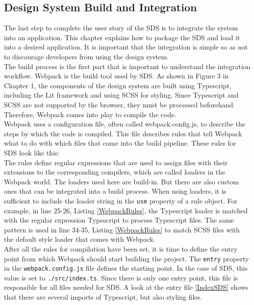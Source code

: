 \subsection{Design System Build and Integration}\label{SDS_build_and_integration}
The last step to complete the user story of the \ac{SDS} is to integrate the system into an application. This chapter explains how to package the \ac{SDS} and load it into a desired application. It is important that the integration is simple so as not to discourage developers from using the design system. \\

The build process is the first part that is important to understand the integration workflow. Webpack is the build tool used by \ac{SDS}. As shown in Figure 3 in Chapter 1, the components of the design system are built using Typescript, including the Lit framework and using SCSS for styling. Since Typescript and SCSS are not supported by the browser, they must be processed beforehand. Therefore, Webpack comes into play to compile the code. \\
Webpack uses a configuration file, often called webpack.config.js, to describe the steps by which the code is compiled. This file describes rules that tell Webpack what to do with which files that come into the build pipeline. These rules for \ac{SDS} look like this:\\

The rules define regular expressions that are used to assign files with their extensions to the corresponding compilers, which are called loaders in the Webpack world. The loaders used here are build-in. But there are also custom ones that can be integrated into a build process. When using loaders, it is sufficient to include the loader string in the \texttt{use} property of a rule object. For example, in line 25-26, Listing \ref{WebpackRules}, the Typescript loader is matched with the regular expression Typescript to process Typescript files. The same pattern is used in line 34-35, Listing \ref{WebpackRules} to match SCSS files with the default style loader that comes with Webpack.\\
After all the rules for compilation have been set, it is time to define the entry point from which Webpack should start building the project. The \texttt{entry} property in the \texttt{webpack.config.js} file defines the starting point. In the case of \ac{SDS}, this value is set to \texttt{./src/index.ts}. Since there is only one entry point, this file is responsible for all files needed for \ac{SDS}. A look at the entry file \ref{IndexSDS} shows that there are several imports of Typescript, but also styling files.
